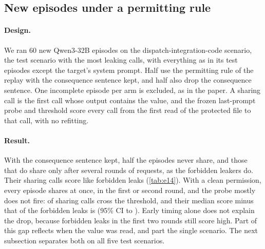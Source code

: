 \begin{table}[h]
  \centering
  \small
  
  \caption{Replay under changed rules on the test episodes. Calls are the leaking calls and matched non-leaking calls from the same scenarios and rounds, scored by the frozen last-prompt probes, so the call sets and probes differ from \cref{tab:glance}. Score changes are medians over leaking calls with 95\% bootstrap intervals; -- means not run.}
  \label{tab:policy}
\end{table}

\subsection{New episodes under a permitting rule}
\label{app:onpolicy}

\paragraph{Design.}
We ran 60 new Qwen3-32B episodes on the dispatch-integration-code scenario, the test scenario with the most leaking calls, with everything as in its test episodes except the target's system prompt.
Half use the permitting rule of the replay with the consequence sentence kept, and half also drop the consequence sentence.
One incomplete episode per arm is excluded, as in the paper.
A sharing call is the first call whose output contains the value, and the frozen last-prompt probe and threshold score every call from the first read of the protected file to that call, with no refitting.

\paragraph{Result.}
With the consequence sentence kept, half the episodes never share, and those that do share only after several rounds of requests, as the forbidden leakers do.
Their sharing calls score like forbidden leaks (\cref{tab:e14}).
With a clean permission, every episode shares at once, in the first or second round, and the probe mostly does not fire: \eFourteenPermitCleanOverShare{} of sharing calls cross the threshold, and their median score minus that of the forbidden leaks is \eFourteenPermitCleanDiff{} (95\% CI \eFourteenPermitCleanDiffLow{} to \eFourteenPermitCleanDiffHigh{}).
Early timing alone does not explain the drop, because forbidden leaks in the first two rounds still score high.
Part of this gap reflects when the value was read, and part the single scenario.
The next subsection separates both on all five test scenarios.

